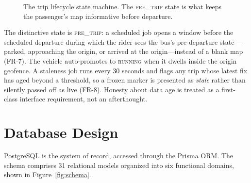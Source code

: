 \begin{figure}[H]
\centering
{}%
\caption{The trip lifecycle state machine. The \textsc{pre\_trip} state is
what keeps the passenger's map informative before departure.}
\label{fig:lifecycle}
\end{figure}

The distinctive state is
\textsc{pre\_trip}: a scheduled job opens a window before the scheduled
departure during which the rider sees the bus's pre-departure state
---parked, approaching the origin, or arrived at the origin---instead of
a blank map (FR-7). The vehicle auto-promotes to \textsc{running} when it
dwells inside the origin geofence. A staleness job runs every 30 seconds
and flags any trip whose latest fix has aged beyond a threshold, so a
frozen marker is presented as \emph{stale} rather than silently passed
off as live (FR-8). Honesty about data age is treated as a first-class
interface requirement, not an afterthought.

\section{Database Design}
\label{sec:design-database}
PostgreSQL is the system of record, accessed through the Prisma ORM. The
schema comprises 31 relational models organized into six functional
domains, shown in Figure~\ref{fig:schema}.

